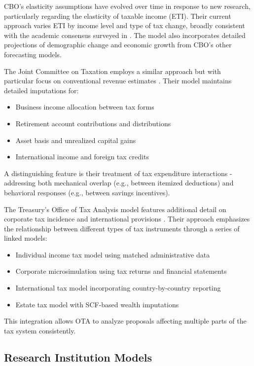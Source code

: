 CBO's elasticity assumptions have evolved over time in response to new research, particularly regarding the elasticity of taxable income (ETI). Their current approach varies ETI by income level and type of tax change, broadly consistent with the academic consensus surveyed in \citep{saez2012}. The model also incorporates detailed projections of demographic change and economic growth from CBO's other forecasting models.

The Joint Committee on Taxation employs a similar approach but with particular focus on conventional revenue estimates \citep{jct2023}. Their model maintains detailed imputations for:

\begin{itemize}
    \item Business income allocation between tax forms
    \item Retirement account contributions and distributions
    \item Asset basis and unrealized capital gains
    \item International income and foreign tax credits
\end{itemize}

A distinguishing feature is their treatment of tax expenditure interactions - addressing both mechanical overlap (e.g., between itemized deductions) and behavioral responses (e.g., between savings incentives).

The Treasury's Office of Tax Analysis model features additional detail on corporate tax incidence and international provisions \citep{ota2012}. Their approach emphasizes the relationship between different types of tax instruments through a series of linked models:

\begin{itemize}
    \item Individual income tax model using matched administrative data
    \item Corporate microsimulation using tax returns and financial statements
    \item International tax model incorporating country-by-country reporting
    \item Estate tax model with SCF-based wealth imputations
\end{itemize}

This integration allows OTA to analyze proposals affecting multiple parts of the tax system consistently.

\subsection{Research Institution Models}

